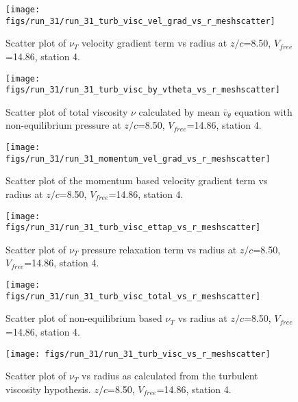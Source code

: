 \begin{figure}[H]
\centering
\texttt{[image: figs/run\_31/run\_31\_turb\_visc\_vel\_grad\_vs\_r\_meshscatter]}
\caption{Scatter plot of $\nu_T$ velocity gradient term vs radius at $z/c$=8.50, $V_{free}$=14.86, station 4.}
\end{figure}


\begin{figure}[H]
\centering
\texttt{[image: figs/run\_31/run\_31\_turb\_visc\_by\_vtheta\_vs\_r\_meshscatter]}
\caption{Scatter plot of total viscosity $\nu$ calculated by mean $\bar{v}_{\theta}$ equation with non-equilibrium pressure at $z/c$=8.50, $V_{free}$=14.86, station 4.}
\end{figure}


\begin{figure}[H]
\centering
\texttt{[image: figs/run\_31/run\_31\_momentum\_vel\_grad\_vs\_r\_meshscatter]}
\caption{Scatter plot of the momentum based velocity gradient term vs radius at $z/c$=8.50, $V_{free}$=14.86, station 4.}
\end{figure}


\begin{figure}[H]
\centering
\texttt{[image: figs/run\_31/run\_31\_turb\_visc\_ettap\_vs\_r\_meshscatter]}
\caption{Scatter plot of $\nu_T$ pressure relaxation term vs radius at $z/c$=8.50, $V_{free}$=14.86, station 4.}
\end{figure}


\begin{figure}[H]
\centering
\texttt{[image: figs/run\_31/run\_31\_turb\_visc\_total\_vs\_r\_meshscatter]}
\caption{Scatter plot of non-equilibrium based $\nu_T$ vs radius at $z/c$=8.50, $V_{free}$=14.86, station 4.}
\end{figure}


\begin{figure}[H]
\centering
\texttt{[image: figs/run\_31/run\_31\_turb\_visc\_vs\_r\_meshscatter]}
\caption{Scatter plot of $\nu_T$ vs radius as calculated from the turbulent viscosity hypothesis. $z/c$=8.50, $V_{free}$=14.86, station 4.}
\end{figure}


